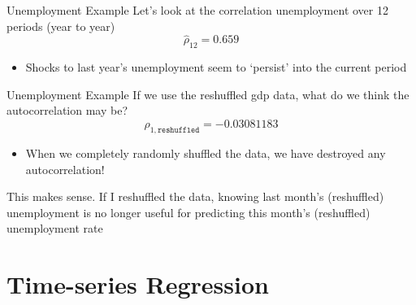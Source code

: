 \documentclass[aspectratio=169,t,11pt,table]{beamer}
\begin{document}
\begin{frame}{Unemployment Example}
  Let's look at the correlation unemployment over 12 periods (year to year)
  $$
    \hat{\rho}_{12} = 0.659
  $$
  \begin{itemize}
    \item Shocks to last year's unemployment seem to `persist' into the current period
  \end{itemize}
\end{frame}

\begin{frame}{Unemployment Example}
  If we use the reshuffled gdp data, what do we think the autocorrelation may be?
  \pause
  $$
    \hat{\rho}_{1, \texttt{reshuffled}} =  -0.03081183
  $$  
  \begin{itemize}
    \item When we completely randomly shuffled the data, we have destroyed any autocorrelation! 
  \end{itemize}

  \pause  
  \bigskip
  This makes sense. If I reshuffled the data, knowing last month's (reshuffled) unemployment is no longer useful for predicting this month's (reshuffled) unemployment rate
\end{frame}




\section{Time-series Regression}

% 
% 
\end{document}
